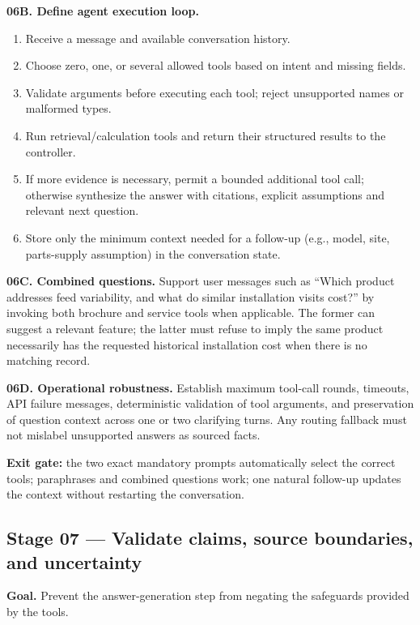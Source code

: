 \documentclass[11pt,a4paper]{article}
\begin{document}
\textbf{06B. Define agent execution loop.}
\begin{enumerate}
\item Receive a message and available conversation history.
\item Choose zero, one, or several allowed tools based on intent and missing fields.
\item Validate arguments before executing each tool; reject unsupported names or malformed types.
\item Run retrieval/calculation tools and return their structured results to the controller.
\item If more evidence is necessary, permit a bounded additional tool call; otherwise synthesize the answer with citations, explicit assumptions and relevant next question.
\item Store only the minimum context needed for a follow-up (e.g., model, site, parts-supply assumption) in the conversation state.
\end{enumerate}
\textbf{06C. Combined questions.} Support user messages such as ``Which product addresses feed variability, and what do similar installation visits cost?'' by invoking both brochure and service tools when applicable. The former can suggest a relevant feature; the latter must refuse to imply the same product necessarily has the requested historical installation cost when there is no matching record.

\textbf{06D. Operational robustness.} Establish maximum tool-call rounds, timeouts, API failure messages, deterministic validation of tool arguments, and preservation of question context across one or two clarifying turns. Any routing fallback must not mislabel unsupported answers as sourced facts.

\textbf{Exit gate:} the two exact mandatory prompts automatically select the correct tools; paraphrases and combined questions work; one natural follow-up updates the context without restarting the conversation.

\subsection{Stage 07 --- Validate claims, source boundaries, and uncertainty}
\textbf{Goal.} Prevent the answer-generation step from negating the safeguards provided by the tools.
\end{document}
